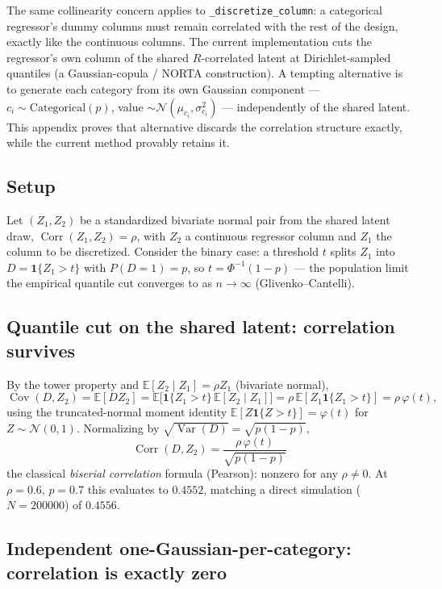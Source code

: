 \documentclass[11pt]{article}
\begin{document}
The same collinearity concern applies to \texttt{\_discretize\_column}: a
categorical regressor's dummy columns must remain correlated with the rest of
the design, exactly like the continuous columns. The current implementation
cuts the regressor's own column of the shared $R$-correlated latent at
Dirichlet-sampled quantiles (a Gaussian-copula / NORTA construction). A
tempting alternative is to generate each category from its own Gaussian
component --- $c_i \sim \mathrm{Categorical}(p)$, value $\sim \mathcal
N(\mu_{c_i}, \sigma_{c_i}^2)$ --- independently of the shared latent. This
appendix proves that alternative discards the correlation structure exactly,
while the current method provably retains it.

\subsection*{Setup}

Let $(Z_1, Z_2)$ be a standardized bivariate normal pair from the shared
latent draw, $\operatorname{Corr}(Z_1, Z_2) = \rho$, with $Z_2$ a continuous
regressor column and $Z_1$ the column to be discretized. Consider the binary
case: a threshold $t$ splits $Z_1$ into $D = \mathbf 1\{Z_1 > t\}$ with
$P(D=1) = p$, so $t = \Phi^{-1}(1-p)$ --- the population limit the empirical
quantile cut converges to as $n\to\infty$ (Glivenko--Cantelli).

\subsection*{Quantile cut on the shared latent: correlation survives}

By the tower property and $\mathbb E[Z_2 \mid Z_1] = \rho Z_1$ (bivariate
normal),
\[
  \operatorname{Cov}(D, Z_2) = \mathbb E[D Z_2]
  = \mathbb E\big[\mathbf 1\{Z_1 > t\}\,\mathbb E[Z_2 \mid Z_1]\big]
  = \rho\,\mathbb E[Z_1 \mathbf 1\{Z_1 > t\}] = \rho\,\varphi(t),
\]
using the truncated-normal moment identity $\mathbb E[Z\mathbf 1\{Z>t\}] =
\varphi(t)$ for $Z\sim\mathcal N(0,1)$. Normalizing by
$\sqrt{\operatorname{Var}(D)} = \sqrt{p(1-p)}$,
\[
  \boxed{\; \operatorname{Corr}(D, Z_2) = \frac{\rho\,\varphi(t)}{\sqrt{p(1-p)}} \;}
\]
the classical \emph{biserial correlation} formula (Pearson): nonzero for any
$\rho \neq 0$. At $\rho = 0.6$, $p = 0.7$ this evaluates to $0.4552$, matching
a direct simulation ($N=\num{200000}$) of $0.4556$.

\subsection*{Independent one-Gaussian-per-category: correlation is exactly zero}
\end{document}
